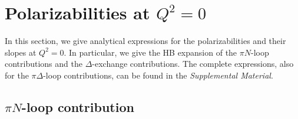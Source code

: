 \documentclass[12pt,preprint,tightenlines,
showpacs,preprintnumbers,amsmath,amssymb,
a4paper,nofootinbib]{revtex4-2}
\begin{document}
\section{Polarizabilities at $Q^2=0$}\label{App:PolarizabilitiesAll}

In this section, we give analytical expressions for the polarizabilities and their slopes at $Q^2=0$. In particular, we give the HB expansion of the $\pi N$-loop contributions and the $\Delta$-exchange contributions. The complete expressions, also for the $\pi \Delta$-loop contributions, can be found in the {\it Supplemental Material}.

\subsection{$\pi N$-loop  contribution}
\end{document}
